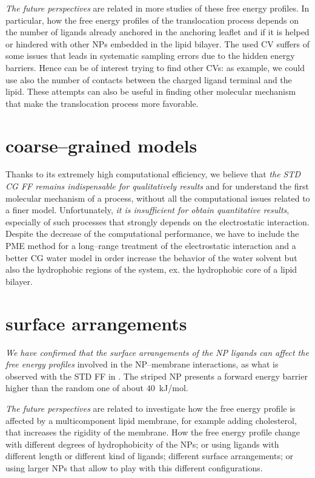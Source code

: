 \textit{The future perspectives} are related in more studies of these free energy profiles. In particular, how the free energy profiles of the translocation process depends on the number of ligands already anchored in the anchoring leaflet and if it is helped or hindered with other \acp{NP} embedded in the lipid bilayer. The used \ac{CV} suffers of some issues that leads in systematic sampling errors due to the hidden energy barriers. Hence can be of interest trying to find other \acp{CV}: as example, we could use also the number of contacts between the charged ligand terminal and the lipid. These attempts can also be useful in finding other molecular mechanism that make the translocation process more favorable.

\section{coarse--grained models}
Thanks to its extremely high computational efficiency, we believe that \textit{the \ac{STD}} \martini \textit{\ac{CG} \ac{FF} remains indispensable for qualitatively results} and for understand the first molecular mechanism of a process, without all the computational issues related to a finer model. Unfortunately, \textit{it is insufficient for obtain quantitative results}, especially of such processes that strongly depends on the electrostatic interaction. Despite the decrease of the computational performance, we have to include the \ac{PME} method for a long--range treatment of the electrostatic interaction and a better \ac{CG} water model in order increase the behavior of the water solvent but also the hydrophobic regions of the system, ex. the hydrophobic core of a lipid bilayer. 

\section{surface arrangements}
\textit{We have confirmed that the surface arrangements of the \ac{NP} ligands can affect the free energy profiles} involved in the \ac{NP}--membrane interactions, as what is observed with the \ac{STD} \martini \ac{FF} in \cite{ourPaper}. The striped \ac{NP} presents a forward energy barrier higher than the random one of about $40$~kJ/mol. 

\textit{The future perspectives} are related to investigate how the free energy profile is affected by a multicomponent lipid membrane, for example adding cholesterol, that increases the rigidity of the membrane. How the free energy profile change with different degrees of hydrophobicity of the \acp{NP}; or using ligands with different length or different kind of ligands; different surface arrangements; or using larger \acp{NP} that allow to play with this different configurations.


\restoretoc
\endgroup